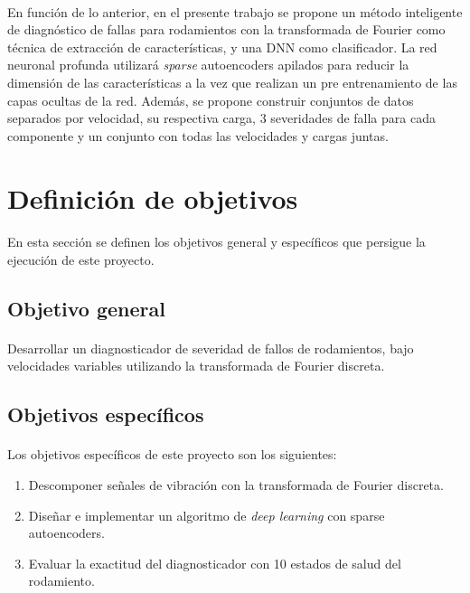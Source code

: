 \documentclass[12pt]{article}%
\begin{document}
\paragraph{}
En función de lo anterior, en el presente trabajo se propone un método inteligente de diagnóstico de fallas para rodamientos con la transformada de Fourier como técnica de extracción de características, y una DNN como clasificador. La red neuronal profunda utilizará \textit{sparse} autoencoders apilados para reducir la dimensión de las características a la vez que realizan un pre entrenamiento de las capas ocultas de la red. Además, se propone construir conjuntos de datos separados por velocidad, su respectiva carga, 3 severidades de falla para cada componente y un conjunto con todas las velocidades y cargas juntas.

\newpage
\section{Definición de objetivos}
\paragraph{}
En esta sección se definen los objetivos general y específicos que persigue la ejecución de este proyecto.
\subsection{Objetivo general}
\paragraph{}
Desarrollar un diagnosticador de severidad de fallos de rodamientos, bajo velocidades variables utilizando la transformada de Fourier discreta.

\subsection{Objetivos específicos}
\paragraph{}
Los objetivos específicos de este proyecto son los siguientes:
\begin{enumerate}
\item{Descomponer señales de vibración con la transformada de Fourier discreta.}
\item{Diseñar e implementar un algoritmo de \textit{deep learning} con sparse autoencoders.}
\item{Evaluar la exactitud del diagnosticador con 10 estados de salud del rodamiento.}
\end{enumerate}
\end{document}
